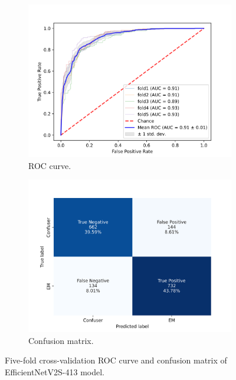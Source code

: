 \begin{figure}[h!]
	\centering
	\begin{subfigure}[b]{0.49\textwidth}
		\centering
		\includegraphics[width=\textwidth,keepaspectratio]{images/Supplement4/EfficientNetV2SHAMIMGCOPYWEIGHTEC413_MultiROC.png}
		\caption{ROC curve.}
	\end{subfigure}
	\hfill
	\begin{subfigure}[b]{0.49\textwidth}
		\centering
		\includegraphics[width=\textwidth,keepaspectratio]{images/Supplement4/EfficientNetV2SHAMIMGCOPYWEIGHTEC413_Combined_CM.png}
		\caption{Confusion matrix.}
	\end{subfigure}
	\caption{Five-fold cross-validation ROC curve and confusion matrix of EfficientNetV2S-413 model.}
\end{figure}

